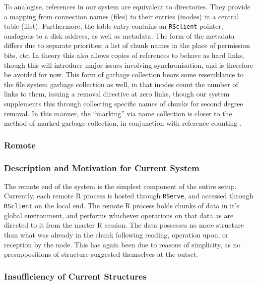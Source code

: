 To analogise, references in our system are equivalent to directories.
They provide a mapping from connection names (files) to their entries
(inodes) in a central table (ilist). Furthermore, the table entry
contains an \texttt{RSclient} pointer, analogous to a disk address, as
well as metadata. The form of the metadata differs due to separate
priorities; a list of chunk names in the place of permission bits, etc.
In theory this also allows copies of references to behave as hard links,
though this will introduce major issues involving synchronisation, and
is therefore be avoided for now. This form of garbage collection bears
some resemblance to the file system garbage collection as well, in that
inodes count the number of links to them, issuing a removal directive at
zero links, though our system supplements this through collecting
specific names of chunks for second degree removal. In this manner, the
``marking'' via name collection is closer to the method of marked
garbage collection, in conjunction with reference counting
\cite{knuth1}.

\hypertarget{remote}{%
\subsubsection{Remote}\label{remote}}

\hypertarget{description-and-motivation-for-current-system}{%
\subsubsection{Description and Motivation for Current
System}\label{description-and-motivation-for-current-system}}

The remote end of the system is the simplest component of the entire
setup. Currently, each remote R process is hosted through
\texttt{RServe}, and accessed through \texttt{RSclient} on the local
end. The remote R process holds chunks of data in it's global
environment, and performs whichever operations on that data as are
directed to it from the master R session. The data possesses no more
structure than what was already in the chunk following reading,
operation upon, or reception by the node. This has again been due to
reasons of simplicity, as no presuppositions of structure suggested
themselves at the outset.

\hypertarget{insufficiency-of-current-structures-1}{%
\subsubsection{Insufficiency of Current
Structures}\label{insufficiency-of-current-structures-1}}

